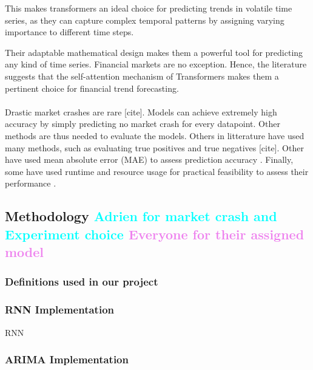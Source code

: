 \documentclass[12pt, letterpaper]{article}
\begin{document}
    This makes transformers an ideal choice for predicting trends in volatile time series, as they can capture complex temporal patterns by assigning varying importance to different time steps. 

    Their adaptable mathematical design makes them a powerful tool for predicting any kind of time series. Financial markets are no exception. Hence, the literature suggests that the self-attention mechanism of Transformers makes them a pertinent choice for financial trend forecasting.



    \paragraph*{}
    Drastic market crashes are rare [cite]. Models can achieve extremely high accuracy by simply predicting no market crash for every datapoint. Other methods are thus needed to evaluate the models. Others in litterature have used many methods, such as evaluating true positives and true negatives [cite]. Other have used mean absolute error (MAE) to assess prediction accuracy \cite{hyndman2018}. Finally, some have used runtime and resource usage for practical feasibility to assess their performance \cite{lim2021temporal}.

\subsection*{Methodology \textcolor{cyan}{Adrien for market crash and Experiment choice} \textcolor{violet}{Everyone for their assigned model}}
\subsubsection*{Definitions used in our project}



\subsubsection*{RNN Implementation}

RNN

\subsubsection*{ARIMA Implementation}
\end{document}
